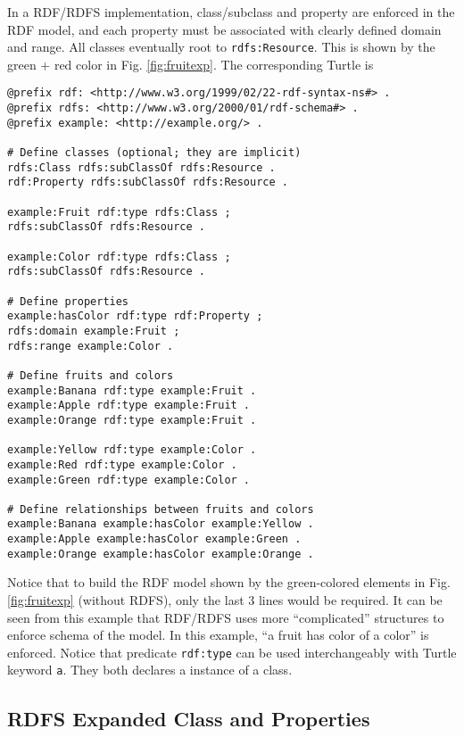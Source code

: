 In a RDF/RDFS implementation, class/subclass and property are enforced in the RDF model, and each property must be associated with clearly defined domain and range. All classes eventually root to \verb|rdfs:Resource|. This is shown by the green + red color in Fig. \ref{fig:fruitexp}. The corresponding Turtle is
\begin{lstlisting}
@prefix rdf: <http://www.w3.org/1999/02/22-rdf-syntax-ns#> .
@prefix rdfs: <http://www.w3.org/2000/01/rdf-schema#> .
@prefix example: <http://example.org/> .

# Define classes (optional; they are implicit)
rdfs:Class rdfs:subClassOf rdfs:Resource .
rdf:Property rdfs:subClassOf rdfs:Resource .

example:Fruit rdf:type rdfs:Class ;
rdfs:subClassOf rdfs:Resource .

example:Color rdf:type rdfs:Class ;
rdfs:subClassOf rdfs:Resource .

# Define properties
example:hasColor rdf:type rdf:Property ;
rdfs:domain example:Fruit ;
rdfs:range example:Color .

# Define fruits and colors
example:Banana rdf:type example:Fruit .
example:Apple rdf:type example:Fruit .
example:Orange rdf:type example:Fruit .

example:Yellow rdf:type example:Color .
example:Red rdf:type example:Color .
example:Green rdf:type example:Color .

# Define relationships between fruits and colors
example:Banana example:hasColor example:Yellow .
example:Apple example:hasColor example:Green .
example:Orange example:hasColor example:Orange .

\end{lstlisting}
Notice that to build the RDF model shown by the green-colored elements in Fig. \ref{fig:fruitexp} (without RDFS), only the last 3 lines would be required. It can be seen from this example that RDF/RDFS uses more ``complicated'' structures to enforce schema of the model. In this example, ``a fruit has color of a color'' is enforced. Notice that predicate \verb|rdf:type| can be used interchangeably with Turtle keyword \verb|a|. They both declares a instance of a class.

\subsection{RDFS Expanded Class and Properties}

